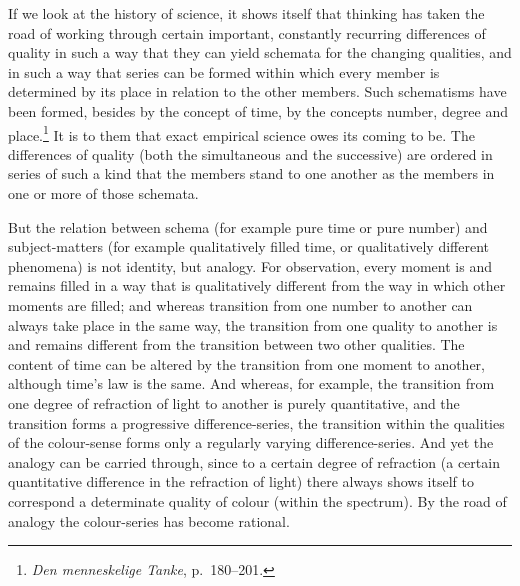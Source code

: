\documentclass[12pt]{book}
\newcommand{\opage}[1]{\marginnote{\footnotesize\textit{[#1]}}}
\begin{document}
\opage{44}If we look at the history of science, it shows itself that thinking has taken the
road of working through certain important, constantly recurring differences of
quality in such a way that they can yield schemata for the changing qualities, and
in such a way that series can be formed within which every member is determined by
its place in relation to the other members. Such schematisms have been formed,
besides by the concept of time, by the concepts number, degree and
place.\footnote{\textit{Den menneskelige Tanke}, p.\ 180--201.} It is to them that
exact empirical science owes its coming to be. The differences of quality (both
the simultaneous and the successive) are ordered in series of such a kind that
the members stand to one another as the members in one or more of those schemata.

But the relation between schema (for example pure time or pure number) and
subject-matters (for example qualitatively filled time, or qualitatively different
phenomena) is not identity, but analogy. For observation, every moment is and
remains filled in a way that is qualitatively different from the way in which
other moments are filled; and whereas transition from one number to another can
always take place in the same way, the transition from one quality to another is
and remains different from the transition between two other qualities. The content
of time can be altered by the transition from one moment to another, although
time's law is the same. And whereas, for example, the transition from one degree of
refraction of light to another is purely quantitative, and the transition forms a
progressive difference-series, the transition within the qualities of the
colour-sense forms only a regularly varying difference-series. And yet the analogy
can be carried through, since to a certain degree of refraction (a certain
quantitative difference in the refraction of light) there always shows itself to
correspond a determinate quality of colour (within the spectrum). By the road of
analogy the colour-series has become rational.
\end{document}
